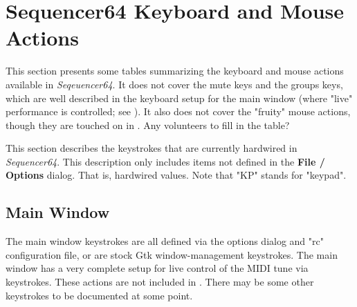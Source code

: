 %
%
%

\section{Sequencer64 Keyboard and Mouse Actions}
\label{sec:kbd_mouse_actions}

   This section presents some tables summarizing the keyboard and mouse actions
   available in \textsl{Seqeuencer64}.
   It does not cover the mute keys and the groups keys, which are well
   described in the keyboard setup for the main window (where "live"
   performance is controlled;
   see ).
   It also does not cover the "fruity" mouse actions, though they are touched
   on in .
   Any volunteers to fill in the table?

   This section describes the keystrokes that are currently hardwired
   in \textsl{Sequencer64}.
   This description only includes
   items not defined in the \textbf{File / Options}
   dialog.  That is, hardwired values.
   Note that "KP" stands for "keypad".

\subsection{Main Window}
\label{subsec:kbd_mouse_main_window}

   The main window keystrokes are all defined via the options dialog
   and "rc" configuration file, or are stock Gtk window-management keystrokes.
   The main window has a very complete setup for live control of the MIDI tune
   via keystrokes.  These actions are not included in
   .
   There may be some other keystrokes to be documented at some point.

